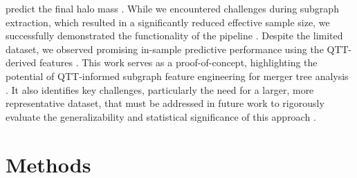 \documentclass[twocolumn]{aastex631}
\begin{document}
predict the final halo mass \citep{robles2022deeplearningapproachhalo,jespersen2022textttmangrovelearninggalaxyproperties,jung2024mergertreebasedgalaxymatching}. While we encountered challenges during subgraph extraction, which resulted in a significantly reduced effective sample size, we successfully demonstrated the functionality of the pipeline \citep{jung2024mergertreebasedgalaxymatching}. Despite the limited dataset, we observed promising in-sample predictive performance using the QTT-derived features \citep{jespersen2022textttmangrovelearninggalaxyproperties}. This work serves as a proof-of-concept, highlighting the potential of QTT-informed subgraph feature engineering for merger tree analysis \citep{jespersen2022textttmangrovelearninggalaxyproperties,jung2024mergertreebasedgalaxymatching}. It also identifies key challenges, particularly the need for a larger, more representative dataset, that must be addressed in future work to rigorously evaluate the generalizability and statistical significance of this approach \citep{jung2024mergertreebasedgalaxymatching}.

\section{Methods}
\label{sec:methods}
\end{document}
